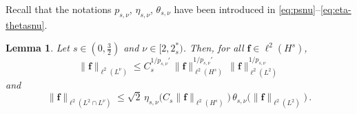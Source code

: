 \documentclass[12pt,a4paper]{amsart}
\newtheorem{lemma}[theorem]{Lemma}
\numberwithin{equation}{section}
\newcommand{\ulf}{\boldsymbol{f}}
\newcommand{\twoasts}{{2^*_s}}
\newcommand{\psnu}{p_{s,\nu}}
\newcommand{\thetasnu}{\theta_{s,\nu}}
\begin{document}
	
	
	Recall that the notations $\psnu$, $\eta_{s,\nu}$, $\thetasnu$ have been introduced in \eqref{eq:psnu}--\eqref{eq:eta-thetasnu}. 
	
	\begin{lemma}\label{lem:interpolation_ineq}
		Let $s\in(0,\frac32)$ and $ \nu \in [2,\twoasts )$. Then, for all $\ulf  \in \ell^2(H^s) $,
		\begin{equation}\label{eq:bound-hoelder-sobolev-general-r}
			\| \ulf  \|_{\ell^2(L^{\nu})} 
			\leq C_s^{1/\psnu'} \, \| \ulf  \|_{\ell^2(H^{s})}^{1/\psnu'} \, \| \ulf  \|_{\ell^2(L^2)}^{1/\psnu}
		\end{equation}
		and
		\begin{equation}\label{eq:bound-hoelder-sobolev-general-nu-and-two}
			\| \ulf  \|_{\ell^2(L^2\cap L^{\nu})} 
			\leq \sqrt{2}\,\eta_{s,\nu}\big(C_s \| \ulf\|_{\ell^2(H^{s})}\big) \, \thetasnu \big(\| \ulf  \|_{\ell^2(L^2)}\big)\,.
		\end{equation}
	\end{lemma}
	
\end{document}
